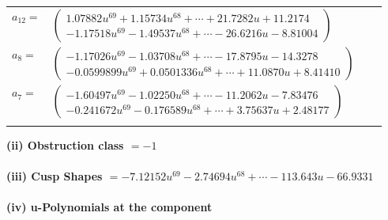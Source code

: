 \documentclass[1p]{elsarticle_modified}
\theoremstyle{definition}
\begin{document}
\begin{tabular}{m{7pt} m{180pt} m{7pt} m{180pt} }
\flushright $a_{12}=$&$\begin{pmatrix}1.07882 u^{69}+1.15734 u^{68}+\cdots+21.7282 u+11.2174\\-1.17518 u^{69}-1.49537 u^{68}+\cdots-26.6216 u-8.81004\end{pmatrix}$ \\
\flushright $a_{8}=$&$\begin{pmatrix}-1.17026 u^{69}-1.03708 u^{68}+\cdots-17.8795 u-14.3278\\-0.0599899 u^{69}+0.0501336 u^{68}+\cdots+11.0870 u+8.41410\end{pmatrix}$ \\
\flushright $a_{7}=$&$\begin{pmatrix}-1.60497 u^{69}-1.02250 u^{68}+\cdots-11.2062 u-7.83476\\-0.241672 u^{69}-0.176589 u^{68}+\cdots+3.75637 u+2.48177\end{pmatrix}$\\&\end{tabular}
\flushleft \textbf{(ii) Obstruction class $= -1$}\\~\\
\flushleft \textbf{(iii) Cusp Shapes $= -7.12152 u^{69}-2.74694 u^{68}+\cdots-113.643 u-66.9331$}\\~\\
\newpage\renewcommand{\arraystretch}{1}
\flushleft \textbf{(iv) u-Polynomials at the component}\newline \\
\end{document}
